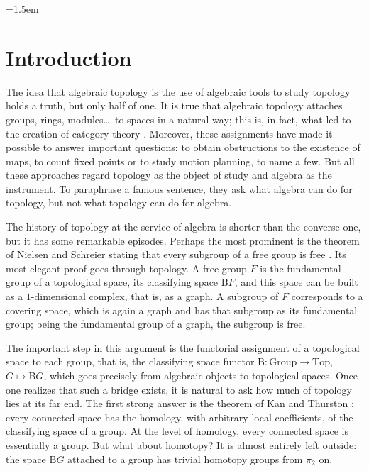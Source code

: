 \documentclass[11pt]{amsart}
\theoremstyle{definition}
\theoremstyle{remark}
\numberwithin{figure}{section}%
\newcommand{\Top}{\mathrm{Top}}
\newcommand{\B}{\mathrm{B}}
\begin{document}
\maketitle

\emergencystretch=1.5em


\section*{Introduction}

The idea that algebraic topology is the use of algebraic tools to study topology holds a truth, but only half of one. It is true that algebraic topology attaches groups, rings, modules\dots\ to spaces in a natural way; this is, in fact, what led to the creation of category theory \cite{kromer2007tool}. Moreover, these assignments have made it possible to answer important questions: to obtain obstructions to the existence of maps, to count fixed points or to study motion planning, to name a few. But all these approaches regard topology as the object of study and algebra as the instrument. To paraphrase a famous sentence, they ask what algebra can do for topology, but not what topology can do for algebra.

The history of topology at the service of algebra is shorter than the converse one, but it has some remarkable episodes. Perhaps the most prominent is the theorem of Nielsen and Schreier stating that every subgroup of a free group is free \cite{Schreier}. Its most elegant proof goes through topology. A free group $F$ is the fundamental group of a topological space, its classifying space $\B F$, and this space can be built as a $1$-dimensional complex, that is, as a graph. A subgroup of $F$ corresponds to a covering space, which is again a graph and has that subgroup as its fundamental group; being the fundamental group of a graph, the subgroup is free.

The important step in this argument is the functorial assignment of a topological space to each group, that is, the classifying space functor $\B\colon \mathrm{Group}\to\Top$, $G\mapsto\B G$, which goes precisely from algebraic objects to topological spaces. Once one realizes that such a bridge exists, it is natural to ask how much of topology lies at its far end. The first strong answer is the theorem of Kan and Thurston \cite{KT}: every connected space has the homology, with arbitrary local coefficients, of the classifying space of a group. At the level of homology, every connected space is essentially a group. But what about homotopy? It is almost entirely left outside: the space $\B G$ attached to a group has trivial homotopy groups from $\pi_2$ on.
\end{document}
